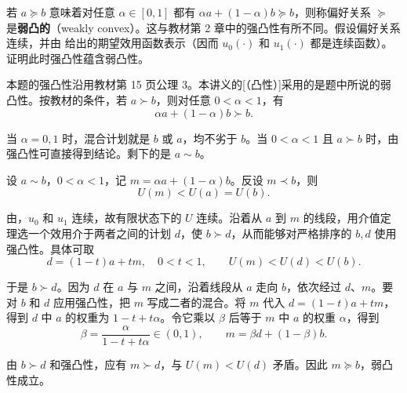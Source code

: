 \begin{problem}
\WJSixProblem{} 若 $a\succeq b$ 意味着对任意 $\alpha\in[0,1]$ 都有 $\alpha a+(1-\alpha)b\succeq b$，则称偏好关系 $\succeq$ 是\textbf{弱凸的}（weakly convex）。这与教材第 2 章中的强凸性有所不同。假设偏好关系连续，并由 给出的期望效用函数表示（因而 $u_0(\cdot)$ 和 $u_1(\cdot)$ 都是连续函数）。证明此时强凸性蕴含弱凸性。
\end{problem}
\begin{solution}[label-content={证明},blank-type=manual,blank-vsep=8\baselineskip]
本题的强凸性沿用教材第 15 页公理 3\ifdefined\WJHandoutKnowledge。本讲义的[（凸性）]采用的是题中所说的弱凸性\fi。按教材的条件，若 $a\succ b$，则对任意 $0<\alpha<1$，有
\[
 \alpha a+(1-\alpha)b\succ b.
\]

当 $\alpha=0,1$ 时，混合计划就是 $b$ 或 $a$，均不劣于 $b$。当 $0<\alpha<1$ 且 $a\succ b$ 时，由强凸性可直接得到结论。剩下的是 $a\sim b$。

设 $a\sim b$，$0<\alpha<1$，记 $m=\alpha a+(1-\alpha)b$。反设 $m\prec b$，则
\[
 U(m)<U(a)=U(b).
\]

由，$u_0$ 和 $u_1$ 连续，故有限状态下的 $U$ 连续。沿着从 $a$ 到 $m$ 的线段，用介值定理选一个效用介于两者之间的计划 $d$，使 $b\succ d$，从而能够对严格排序的 $b,d$ 使用强凸性。具体可取
\[
 d=(1-t)a+tm,\quad 0<t<1,\qquad
 U(m)<U(d)<U(b).
\]

于是 $b\succ d$。因为 $d$ 在 $a$ 与 $m$ 之间，沿着线段从 $a$ 走向 $b$，依次经过 $d$、$m$。要对 $b$ 和 $d$ 应用强凸性，把 $m$ 写成二者的混合。将 $m$ 代入 $d=(1-t)a+tm$，得到 $d$ 中 $a$ 的权重为 $1-t+t\alpha$。令它乘以 $\beta$ 后等于 $m$ 中 $a$ 的权重 $\alpha$，得到
\[
 \beta=\frac{\alpha}{1-t+t\alpha}\in(0,1),
 \qquad m=\beta d+(1-\beta)b.
\]

由 $b\succ d$ 和强凸性，应有 $m\succ d$，与 $U(m)<U(d)$ 矛盾。因此 $m\succeq b$，弱凸性成立。

\end{solution}

